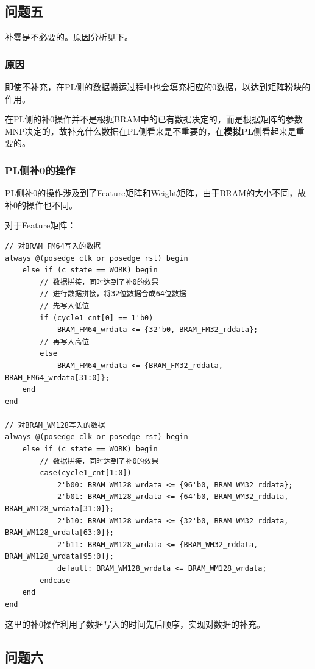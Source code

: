 \documentclass[12pt,a4paper]{article}
\begin{document}
\subsection{问题五}

补零是不必要的。原因分析见下。

\subsubsection{原因}

即使不补充，在PL侧的数据搬运过程中也会填充相应的0数据，以达到矩阵粉块的作用。

在PL侧的补0操作并不是根据BRAM中的已有数据决定的，而是根据矩阵的参数MNP决定的，故补充什么数据在PL侧看来是不重要的，在\textbf{模拟PL}侧看起来是重要的。

\subsubsection{PL侧补0的操作}

PL侧补0的操作涉及到了Feature矩阵和Weight矩阵，由于BRAM的大小不同，故补0的操作也不同。

对于Feature矩阵：

\begin{lstlisting}
// 对BRAM_FM64写入的数据
always @(posedge clk or posedge rst) begin
    else if (c_state == WORK) begin
        // 数据拼接，同时达到了补0的效果
        // 进行数据拼接，将32位数据合成64位数据
        // 先写入低位
        if (cycle1_cnt[0] == 1'b0)
            BRAM_FM64_wrdata <= {32'b0, BRAM_FM32_rddata};
        // 再写入高位
        else
            BRAM_FM64_wrdata <= {BRAM_FM32_rddata, BRAM_FM64_wrdata[31:0]};
    end
end

// 对BRAM_WM128写入的数据
always @(posedge clk or posedge rst) begin
    else if (c_state == WORK) begin
        // 数据拼接，同时达到了补0的效果
        case(cycle1_cnt[1:0])
            2'b00: BRAM_WM128_wrdata <= {96'b0, BRAM_WM32_rddata};
            2'b01: BRAM_WM128_wrdata <= {64'b0, BRAM_WM32_rddata, BRAM_WM128_wrdata[31:0]};
            2'b10: BRAM_WM128_wrdata <= {32'b0, BRAM_WM32_rddata, BRAM_WM128_wrdata[63:0]};
            2'b11: BRAM_WM128_wrdata <= {BRAM_WM32_rddata, BRAM_WM128_wrdata[95:0]};
            default: BRAM_WM128_wrdata <= BRAM_WM128_wrdata;
        endcase
    end
end
\end{lstlisting}

这里的补0操作利用了数据写入的时间先后顺序，实现对数据的补充。

\subsection{问题六}
\end{document}
